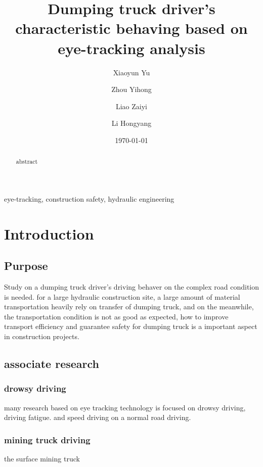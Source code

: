 \documentclass[5p]{elsarticle}
\date{\today}
\title{Dumping truck driver's characteristic behaving based on eye-tracking analysis}
\begin{document}
\begin{abstract}
abstract
\end{abstract}
\begin{keyword}
eye-tracking, construction safety, hydraulic engineering 
\end{keyword}
\author[ctgu]{Xiaoyun Yu}
\author[ctgu]{Zhou Yihong}
\author[ctgu]{Liao Zaiyi}
\author[ctgu]{Li Hongyang}
\address[ctgu]{China Three Gorges University, 8, Daxue Rd, Xiling, Yichang, Hubei, China}
\maketitle
\section{Introduction}
\label{sec:orgdd4eb8e}
\subsection{Purpose}
\label{sec:org7caa330}
Study on a dumping truck driver's driving behaver on the complex road condition is needed. for a large hydraulic construction site, a large amount of material transportation heavily rely on transfer of dumping truck, and on the meanwhile, the transportation condition is not as good as expected, how to improve transport efficiency and guarantee safety for dumping truck is a important aspect in construction projects. 

\subsection{associate research}
\label{sec:org873c302}

\subsubsection{drowsy driving}
\label{sec:org147e48a}
many research based on eye tracking technology is focused on drowsy driving, driving fatigue.\cite{xuRealtimeEyeTracking2018a} \cite{zandiNonintrusiveDetectionDrowsy2019a} and speed driving on a normal road driving.

\subsubsection{mining truck driving}
\label{sec:org194a6e6}
the surface mining truck \cite{sunGPSGoogleEarth2010}
\end{document}

